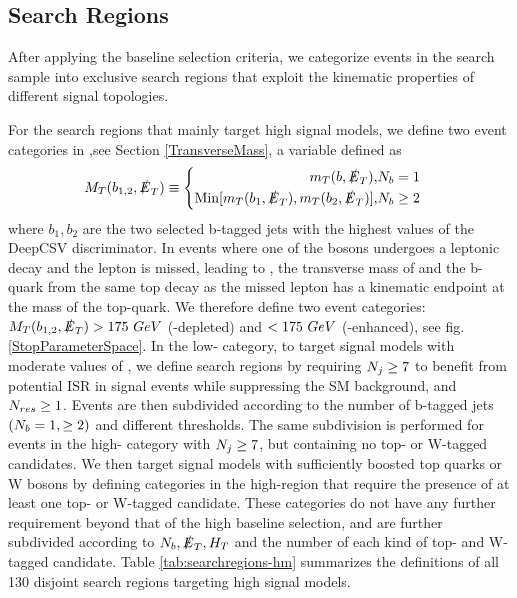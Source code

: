 \subsection{Search Regions}\label{SearchRegions}

After applying the baseline selection criteria, we categorize events in the search sample into exclusive search regions that exploit the kinematic properties of different signal topologies. 

For the search regions that mainly target high \dm{} signal models, we define two event categories in \mtb,see Section \ref{TransverseMass}, a variable defined as
\begin{equation}
M_{T}(b_{1,2},\slashed{E}_{T})\equiv
\begin{cases}
\begin{split}
m_T(b,\slashed{E}_{T}), &N_{b}=1 \\
\text{Min}[m_T(b_1, \slashed{E}_{T}),m_T(b_2,\slashed{E}_{T})], &N_{b}\geq2 \\
\end{split}
\end{cases}
\end{equation}
where $b_1, b_2$ are the two selected b-tagged jets with the highest values of the DeepCSV discriminator. In \ttbar{} events where one of the \W{} bosons undergoes a leptonic decay and the lepton is missed, leading to \met{}, the transverse mass of \met{} and the b-quark from the same top decay as the missed lepton has a kinematic endpoint at the mass of the top-quark. We therefore define two event categories: $M_{T}(b_{1,2},\slashed{E}_{T})>175~GeV$ (\ttbar-depleted) and $< 175~GeV$ (\ttbar-enhanced), see fig. \ref{StopParameterSpace}. In the low-\mtb{} category, to target signal models with moderate values of \dm, we define search regions by requiring $N_{j}\geq7$ to benefit from potential ISR in signal events while suppressing the SM background, and $N_{res}\geq1$. Events are then subdivided according to the number of b-tagged jets $(N_{b}=1,\geq2)$ and different \met{} thresholds. The same subdivision is performed for events in the high-\mtb{} category with $N_{j}\geq7$, but containing no top- or W-tagged candidates. We then target signal models with sufficiently boosted top quarks or W bosons by defining categories in the high-\mtb region that require the presence of at least one top- or W-tagged candidate. These categories do not have any further \nj{} requirement beyond that of the high \dm{} baseline selection, and are further subdivided according to $N_{b}, \slashed{E}_{T}, H_{T}$ and the number of each kind of top- and W-tagged candidate. Table \ref{tab:searchregions-hm} summarizes the definitions of all 130 disjoint search regions targeting high \dm{} signal models.

